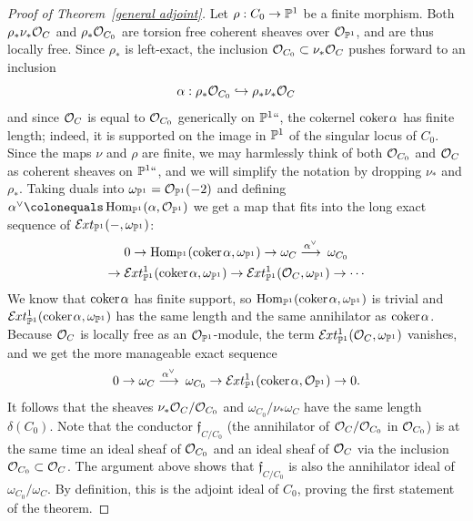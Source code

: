 \begin{proof}[Proof of Theorem~\ref{general adjoint}]
Let
$\rho: C_0 \to {\mathbb P}^1$ be a finite morphism. Both $\rho_*\nu_*{\mathcal O}_C$
and $\rho_*{\mathcal O}_{C_0}$
are torsion free coherent sheaves over ${\mathcal O}_{{\mathbb P}^1}$, and are thus
locally free. Since $\rho_*$ is left-exact,
the inclusion ${\mathcal O}_{C_0} \subset \nu_*{\mathcal O}_C$ pushes forward to an
inclusion
$$
\alpha: \rho_*{\mathcal O}_{C_0} \hookrightarrow \rho_*\nu_*{\mathcal O}_C
$$
and since ${\mathcal O}_C$ is equal to ${\mathcal O}_{C_0}$ generically on ${\mathbb P}^1` `$, the
cokernel ${\rm{coker}\kern1pt} \alpha$ has finite length; indeed, it is supported on the
image in ${\mathbb P}^{1}$ of the singular locus of $C_0$. Since the maps $\nu$
and $\rho$ are finite, we may harmlessly think of both
${\mathcal O}_{C_0}$ and ${\mathcal O}_C$ as coherent sheaves on ${\mathbb P}^1` `$, and we will
simplify the notation by dropping $\nu_*$ and $\rho_*$.
Taking duals into $\omega_{{\mathbb P}^{1}} = {\mathcal O}_{{\mathbb P}^1}(-2)$ and defining
$\alpha^\vee \colonequals \Hom_{\PP^1}(\alpha, \sO_{\PP^1}) $ we get
a map that fits into the long exact sequence
of $\mathcal E\mkern-1mu xt_{{\mathbb P}^1}(-, \omega_{{\mathbb P}^{1}})$:
\begin{multline*}
0\to
\Hom_{\PP^1}(\coker \alpha,\omega_{\PP^{1}})
\to \omega_{C} \ruto {\alpha^\vee}\! \omega_{C_0}\\
\to
\sExt^1_{\PP^1}(\coker \alpha,\omega_{\PP^{1}})
\to
\sExt^1_{\PP^1}(\sO_C,\omega_{\PP^{1}})
\to
\cdots
\end{multline*}
We know that
${\rm{coker}\kern1pt} \alpha$ has finite support,
so
$\operatorname{Hom}_{{\mathbb P}^1}({\rm{coker}\kern1pt} \alpha,\omega_{{\mathbb P}^{1}})$
is trivial
and
$\mathcal E\mkern-1mu xt^1_{{\mathbb P}^1}({\rm{coker}\kern1pt} \alpha, \omega_{{\mathbb P}^{1}})$ has the same length
and the same annihilator
as ${\rm{coker}\kern1pt} \alpha$.
Because ${\mathcal O}_C$ is locally free as an
${\mathcal O}_{{\mathbb P}^1}$-module, the term
$\mathcal E\mkern-1mu xt^1_{{\mathbb P}^1}({\mathcal O}_C, \omega_{{\mathbb P}^{1}})$ vanishes, and we get the more
manageable exact sequence
$$
0\to \omega_{C} \ruto {\alpha^\vee}\! \omega_{C_0} \to
\sExt^1_{\PP^1}(\coker \alpha, \sO_{\PP^1}) \to 0.
$$
It follows that the sheaves $\nu_*{\mathcal O}_C/{\mathcal O}_{C_0}$ and
$\omega_{C_0}/\nu_*\omega_C$ have the same
length $\delta(C_0)$. Note that the
conductor
%
$\mathfrak f_{C/C_0}$
(the annihilator of ${\mathcal O}_C/{\mathcal O}_{C_0}$ in ${\mathcal O}_{C_0}$)
is at the same time an ideal sheaf of ${\mathcal O}_{C_0}$ and an
ideal sheaf of ${\mathcal O}_C$ via the inclusion ${\mathcal O}_{C_0}\subset {\mathcal O}_C$. The
argument above shows that $\mathfrak f_{C/C_0}$ is also the annihilator
ideal of $\omega_{C_0}/\omega_C$. By definition, this is the adjoint
ideal of $C_0$, proving the first statement
of the theorem.


\end{proof}
